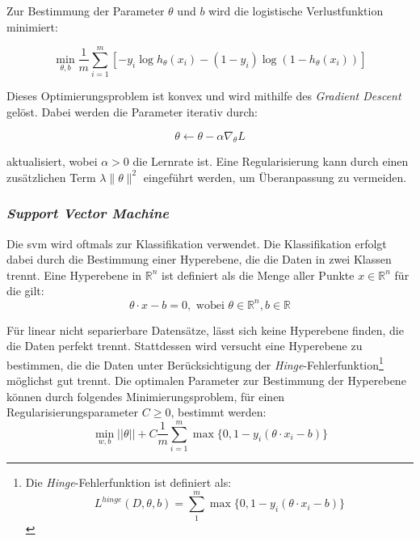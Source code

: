 \documentclass[researchlab,group,]{AIGpaper}
\begin{document}
Zur Bestimmung der Parameter $\theta$ und $b$ wird die logistische Verlustfunktion minimiert:

\begin{equation*}
    \min_{\theta, b} \frac{1}{m} \sum_{i=1}^{m} \left[-y_i \log h_{\theta}(x_i) - (1 - y_i) \log(1 - h_{\theta}(x_i))\right]
\end{equation*}

Dieses Optimierungsproblem ist konvex und wird mithilfe des \textit{Gradient Descent} gelöst. Dabei werden die Parameter iterativ durch:

\begin{equation*}
    \theta \leftarrow \theta - \alpha \nabla_{\theta} L
\end{equation*}

aktualisiert, wobei $\alpha > 0$ die Lernrate ist. Eine Regularisierung kann durch einen zusätzlichen Term $\lambda \lVert\theta\rVert^2$ eingeführt werden, um Überanpassung zu vermeiden.

\subsubsection{\textit{Support Vector Machine}}

Die \gls{svm} wird oftmals zur Klassifikation verwendet.
Die Klassifikation erfolgt dabei durch die Bestimmung einer Hyperebene, die die Daten in zwei Klassen trennt.
Eine Hyperebene in $\mathbb{R}^{n}$ ist definiert als die Menge aller Punkte $x\in\mathbb{R}^n$ für die gilt:
\begin{equation*}
    \theta \cdot x - b = 0, \text{ wobei } \theta \in \mathbb{R}^{n}, b\in\mathbb{R}
\end{equation*}

Für linear nicht separierbare Datensätze, lässt sich keine Hyperebene finden, die die Daten perfekt trennt.
Stattdessen wird versucht eine Hyperebene zu bestimmen, die die Daten unter Berücksichtigung der \textit{Hinge}-Fehlerfunktion\footnote{
Die \textit{Hinge}-Fehlerfunktion ist definiert als:
\begin{equation*}
    L^{hinge}(D, \theta, b) = \sum_{1}^{m}\max\lbrace0, 1 - y_i(\theta \cdot x_i - b)\rbrace
\end{equation*}
} möglichst gut trennt.
Die optimalen Parameter zur Bestimmung der Hyperebene können durch folgendes Minimierungsproblem, für einen Regularisierungsparameter $C\geq0$, bestimmt werden:
\begin{equation*}
    \min_{w, b} \lvert\lvert \theta \rvert\rvert + C \frac{1}{m}\sum_{i=1}^{m} \max\lbrace0, 1 - y_i(\theta \cdot x_i - b)\rbrace
\end{equation*}
\end{document}
